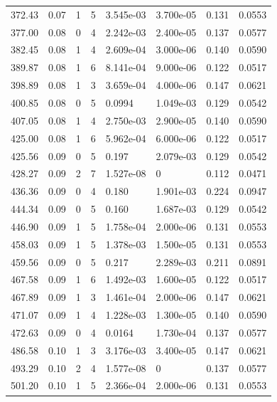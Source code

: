 \documentclass[preview]{standalone}
\begin{document}
{{{\begin{tabular}{L{1.2cm}C{1.2cm} C{0.3cm}C{0.5cm} C{1.4cm}C{1.4cm} C{1.4cm}C{1.4cm}}
  372.43  &  0.07  & 1     &  5 &  3.545e-03  & 3.700e-05  & 0.131 &  0.0553   \\ 
  377.00  &  0.08  & 0     &  4 &  2.242e-03  & 2.400e-05  & 0.137 &  0.0577   \\ 
  382.45  &  0.08  & 1     &  4 &  2.609e-04  & 3.000e-06  & 0.140 &  0.0590   \\ 
  389.87  &  0.08  & 1     &  6 &  8.141e-04  & 9.000e-06  & 0.122 &  0.0517   \\ 
  398.89  &  0.08  & 1     &  3 &  3.659e-04  & 4.000e-06  & 0.147 &  0.0621   \\ 
  400.85  &  0.08  & 0     &  5 &  0.0994  & 1.049e-03  & 0.129 &  0.0542   \\ 
  407.05  &  0.08  & 1     &  4 &  2.750e-03  & 2.900e-05  & 0.140 &  0.0590   \\ 
  425.00  &  0.08  & 1     &  6 &  5.962e-04  & 6.000e-06  & 0.122 &  0.0517   \\ 
  425.56  &  0.09  & 0     &  5 &  0.197  & 2.079e-03  & 0.129 &  0.0542   \\ 
  428.27  &  0.09  & 2     &  7 &  1.527e-08  & 0  & 0.112 &  0.0471   \\ 
  436.36  &  0.09  & 0     &  4 &  0.180  & 1.901e-03  & 0.224 &  0.0947   \\ 
  444.34  &  0.09  & 0     &  5 &  0.160  & 1.687e-03  & 0.129 &  0.0542   \\ 
  446.90  &  0.09  & 1     &  5 &  1.758e-04  & 2.000e-06  & 0.131 &  0.0553   \\ 
  458.03  &  0.09  & 1     &  5 &  1.378e-03  & 1.500e-05  & 0.131 &  0.0553   \\ 
  459.56  &  0.09  & 0     &  5 &  0.217  & 2.289e-03  & 0.211 &  0.0891   \\ 
  467.58  &  0.09  & 1     &  6 &  1.492e-03  & 1.600e-05  & 0.122 &  0.0517   \\ 
  467.89  &  0.09  & 1     &  3 &  1.461e-04  & 2.000e-06  & 0.147 &  0.0621   \\ 
  471.07  &  0.09  & 1     &  4 &  1.228e-03  & 1.300e-05  & 0.140 &  0.0590   \\ 
  472.63  &  0.09  & 0     &  4 &  0.0164  & 1.730e-04  & 0.137 &  0.0577   \\ 
  486.58  &  0.10  & 1     &  3 &  3.176e-03  & 3.400e-05  & 0.147 &  0.0621   \\ 
  493.29  &  0.10  & 2     &  4 &  1.577e-08  & 0  & 0.137 &  0.0577   \\ 
  501.20  &  0.10  & 1     &  5 &  2.366e-04  & 2.000e-06  & 0.131 &  0.0553   \\ 

\end{tabular}}}}
\end{document}
